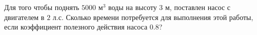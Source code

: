 Для того чтобы поднять $5000$ м$^3$ воды на высоту $3$ м, поставлен
насос с двигателем в $2$ л.с. Сколько времени потребуется для выполнения
этой работы, если коэффициент полезного действия насоса $0.8$?
